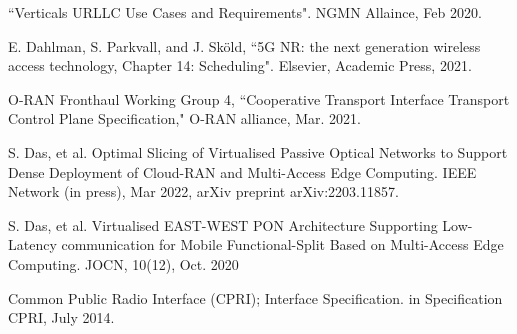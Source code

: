 \documentclass[a4paper, oneside, twocolumn, notitlepage, 10pt]{extarticle_ecoc}
\begin{document}
\begin{thebibliography}{99}
	 ``Verticals URLLC Use Cases and Requirements". NGMN Allaince, Feb 2020.

	E. Dahlman, S. Parkvall, and J. Sk\"{o}ld, ``5G NR: the next generation wireless access technology, Chapter 14: Scheduling". Elsevier, Academic Press, 2021.

	 O-RAN Fronthaul Working Group 4, ``Cooperative Transport Interface Transport Control Plane Specification," O-RAN alliance, Mar. 2021.

	S. Das, et al. Optimal Slicing of Virtualised Passive Optical Networks to Support Dense Deployment of Cloud-RAN and Multi-Access Edge Computing. IEEE Network (in press), Mar 2022, arXiv preprint arXiv:2203.11857.
	
	S. Das, et al. Virtualised EAST-WEST PON Architecture Supporting Low-Latency communication for Mobile Functional-Split Based on Multi-Access Edge Computing. JOCN, 10(12), Oct. 2020

	 Common Public Radio Interface (CPRI); Interface Specification.
	in Specification CPRI, July 2014.

\end{thebibliography}
\end{document}
